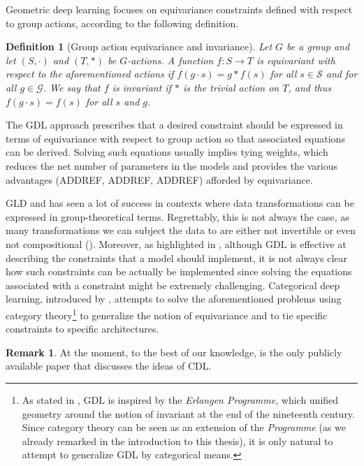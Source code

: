 \documentclass[11pt,a4paper,openright,twoside]{report}
\theoremstyle{plain}
\newtheorem{definition}[proposition]{Definition}
\theoremstyle{definition}
\newtheorem{remark}[proposition]{Remark}
\begin{document}
Geometric deep learning focuses on equivariance constraints defined with respect to group actions, according to the following definition.

\begin{definition}[Group action equivariance and invariance]
  Let $G$ be a group and let $(S, \cdot)$ and $(T, \ast)$ be $G$-actions. A function $f: S \to T$ is equivariant with respect to the aforementioned actions if $f(g \cdot s) = g \ast f(s)$ for all $s \in \mathcal{S}$ and for all $g \in \mathcal{G}$. We say that $f$ is invariant if $\ast$ is the trivial action on $T$, and thus $f(g \cdot s) = f(s)$ for all $s$ and $g$.
\end{definition}

The GDL approach prescribes that a desired constraint should be expressed in terms of equivariance with respect to group action so that associated equations can be derived. Solving such equations usually implies tying weights, which reduces the net number of parameters in the models and provides the various advantages (ADDREF, ADDREF, ADDREF) afforded by equivariance.


GLD and has seen a lot of success in contexts where data transformations can be expressed in group-theoretical terms. Regrettably, this is not always the case, as many transformations we can subject the data to are either not invertible or even not compositional (\cite{gavranovicposition}). Moreover, as highlighted in \cite{gavranovicposition}, although GDL is effective at describing the constraints that a model should implement, it is not always clear how such constraints can be actually be implemented since solving the equations associated with a constraint might be extremely challenging.  
Categorical deep learning, introduced by \cite{gavranovicposition}, attempts to solve the aforementioned problems using category theory\footnote{As stated in \cite{bronstein2021geometric}, GDL is inspired by the \textit{Erlangen Programme}, which unified geometry around the notion of invariant at the end of the nineteenth century. Since category theory can be seen as an extension of the \textit{Programme} (as we already remarked in the introduction to this thesis), it is only natural to attempt to generalize GDL by categorical means.} to generalize the notion of equivariance and to tie specific constraints to specific architectures.

\begin{remark}
  At the moment, to the best of our knowledge,  \cite{gavranovicposition} is the only publicly available paper that discusses the ideas of CDL. 
\end{remark}
\end{document}
